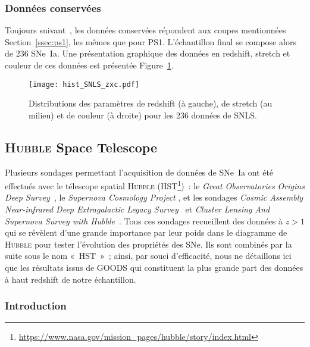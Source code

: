 \documentclass[../main/main.tex]{subfiles}
\begin{document}
\subsubsection{Données conservées}\label{ssec:snlsdata}

Toujours suivant~\cite{scolnic2018}, les données conservées répondent aux coupes
mentionnées Section~\ref{ssec:ps1}, les mêmes que pour PS1. L'échantillon final
se compose alors de 236 SNe~Ia. Une présentation graphique des données en
redshift, stretch et couleur de ces données est présentée
Figure~\ref{fig:snlshist}.

\begin{figure}[ht]
    \centering
    \texttt{[image: hist\_SNLS\_zxc.pdf]}
    \captionsetup{justification=centering}
    \caption{Distributions des paramètres de redshift (à gauche), de stretch (au
    milieu) et de couleur (à droite) pour les 236 données de SNLS.}
    \label{fig:snlshist}
\end{figure}

\subsection{\textsc{Hubble} Space Telescope}\label{ssec:hst}

Plusieurs sondages permettant l'acquisition de données de SNe~Ia ont été
effectués avec le télescope spatial \textsc{Hubble}
(HST\footnote{\href{https://www.nasa.gov/mission_pages/hubble/story/index.html}
{https://www.nasa.gov/mission\_pages/hubble/story/index.html}})~: le
\textit{Great Observatories Origins Deep
Survey}~\citep[GOODS,][]{giavalisco2004, strolger2004, riess2007}, le
\textit{Supernova Cosmology Project} \citep[SCP,][]{suzuki2012}, et les sondages
\textit{Cosmic Assembly Near-infrared Deep Extragalactic Legacy
Survey}~\citep[CANDELS,][]{rodney2014} et \textit{Cluster Lensing And Supernova
Survey with Hubble}~\citep[CLASH,][]{graur2014}. Tous ces sondages recueillent
des données à $z > 1$ qui se révèlent d'une grande importance par leur poids
dans le diagramme de \textsc{Hubble} pour tester l'évolution des propriétés des
SNe. Ils sont combinés par la suite sous le nom «~HST~»~; ainsi, par souci
d'efficacité, nous ne détaillons ici que les résultats issus de GOODS qui
constituent la plus grande part des données à haut redshift de notre
échantillon.

\subsubsection{Introduction}\label{sssec:hstintro}
\end{document}
